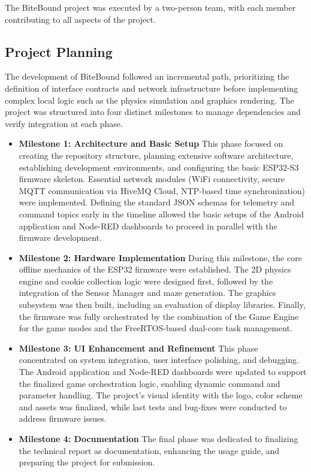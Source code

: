 \documentclass[10pt,journal,final,a4paper]{IEEEtran}
\begin{document}
The BiteBound project was executed by a two-person team, with each member contributing to all aspects of the project.

\subsection{Project Planning}
\label{subsec:project_planning}

The development of BiteBound followed an incremental path, prioritizing the definition of interface contracts and network infrastructure before implementing complex local logic such as the physics simulation and graphics rendering. The project was structured into four distinct milestones to manage dependencies and verify integration at each phase.

\begin{itemize}
    \item \textbf{Milestone 1: Architecture and Basic Setup}
          This phase focused on creating the repository structure, planning extensive software architecture, establishing development environments, and configuring the basic ESP32-S3 firmware skeleton. Essential network modules (WiFi connectivity, secure MQTT communication via HiveMQ Cloud, NTP-based time synchronization) were implemented. Defining the standard JSON schemas for telemetry and command topics early in the timeline allowed the basic setups of the Android application and Node-RED dashboards to proceed in parallel with the firmware development.

    \item \textbf{Milestone 2: Hardware Implementation}
          During this milestone, the core offline mechanics of the ESP32 firmware were established. The 2D physics engine and cookie collection logic were designed first, followed by the integration of the Sensor Manager and maze generation. The graphics subsystem was then built, including an evaluation of display libraries. Finally, the firmware was fully orchestrated by the combination of the Game Engine for the game modes and the FreeRTOS-based dual-core task management.

    \item \textbf{Milestone 3: UI Enhancement and Refinement}
          This phase concentrated on system integration, user interface polishing, and debugging. The Android application and Node-RED dashboards were updated to support the finalized game orchestration logic, enabling dynamic command and parameter handling. The project's visual identity with the logo, color scheme and assets was finalized, while last tests and bug-fixes were conducted to address firmware issues.

    \item \textbf{Milestone 4: Documentation}
          The final phase was dedicated to finalizing the technical report as documentation, enhancing the usage guide, and preparing the project for submission.
\end{itemize}
\end{document}
